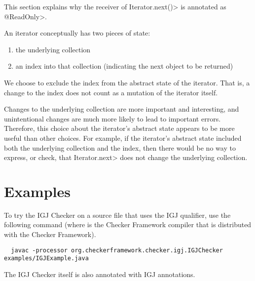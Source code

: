 This section explains why the receiver of \<Iterator.next()> is annotated
as \<@ReadOnly>.

An iterator conceptually has two pieces of state:
\begin{enumerate}
\item
  the underlying collection
\item
  an index into that collection (indicating the next object to be returned)
\end{enumerate}

We choose to exclude the index from the abstract state of the iterator.
That is, a change to the index does not count as a mutation of the
iterator itself.

Changes to the underlying collection are more important and interesting,
and unintentional changes are much more likely to lead to important
errors.  Therefore, this choice about the iterator's abstract state
appears to be more useful than other choices.  For example, if the
iterator's abstract state included both the underlying collection and
the index, then there would be no way to express, or check, that
\<Iterator.next> does not change the underlying collection.


\section{Examples\label{igj-example}}

To try the IGJ Checker on a source file that uses the IGJ qualifier, use
the following command (where  is the Checker Framework compiler that
is distributed with the Checker Framework).

\begin{Verbatim}
  javac -processor org.checkerframework.checker.igj.IGJChecker examples/IGJExample.java
\end{Verbatim}

The IGJ Checker itself is also annotated with IGJ annotations.


